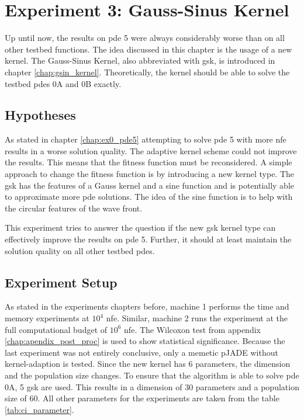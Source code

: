 \documentclass[./\jobname.tex]{subfiles}
\begin{document}
\chapter {Experiment 3: Gauss-Sinus Kernel}
\label{chap:experimet_3}

Up until now, the results on \gls{pde} 5 were always considerably worse than on all other testbed functions. The idea discussed in this chapter is the usage of a new kernel. The Gauss-Sinus Kernel, also abbreviated with \gls{gsk}, is introduced in chapter \ref{chap:gsin_kernel}. Theoretically, the kernel should be able to solve the testbed \gls{pde}s 0A and 0B exactly.  

\section{Hypotheses}
As stated in chapter \ref{chap:ex0_pde5} attempting to solve \gls{pde} 5 with more \gls{nfe} results in a worse solution quality. The adaptive kernel scheme could not improve the results. This means that the fitness function must be reconsidered. A simple approach to change the fitness function is by introducing a new kernel type. The \gls{gsk} has the features of a Gauss kernel and a sine function and is potentially able to approximate more \gls{pde} solutions. The idea of the sine function is to help with the circular features of the wave front. 

This experiment tries to answer the question if the new \gls{gsk} kernel type can effectively improve the results on \gls{pde} 5. Further, it should at least maintain the solution quality on all other testbed \gls{pde}s. 

\section{Experiment Setup}

As stated in the experiments chapters before, machine 1 performs the time and memory experiments at $10^4$ \gls{nfe}. Similar, machine 2 runs the experiment at the full computational budget of $10^6$ \gls{nfe}. The Wilcoxon test from appendix \ref{chap:apendix_post_proc} is used to show statistical significance. Because the last experiment was not entirely conclusive, only a memetic pJADE without kernel-adaption is tested. Since the new kernel has 6 parameters, the dimension and the population size changes. To ensure that the algorithm is able to solve \gls{pde} 0A, 5 \gls{gsk} are used. This results in a dimension of 30 parameters and a population size of 60. All other parameters for the experiments are taken from the table \ref{tab:ci_parameter}. 
\end{document}
